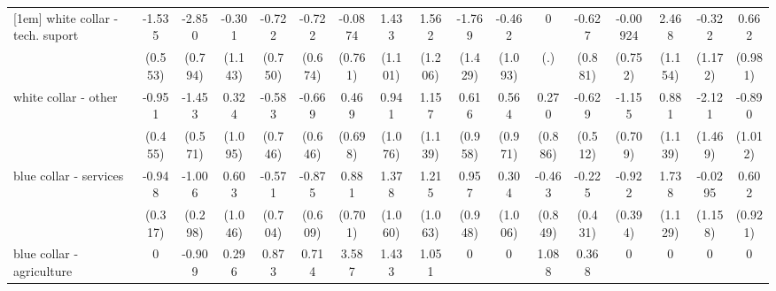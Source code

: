 {\begin{tabular}{l*{16}{c}}
[1em]
white collar - tech. suport&      -1.535\sym{**} &      -2.850\sym{***}&      -0.301         &      -0.722         &      -0.722         &     -0.0874         &       1.433         &       1.562         &      -1.769         &      -0.462         &           0         &      -0.627         &    -0.00924         &       2.468\sym{*}  &      -0.322         &       0.662         \\
                    &     (0.553)         &     (0.794)         &     (1.143)         &     (0.750)         &     (0.674)         &     (0.761)         &     (1.101)         &     (1.206)         &     (1.429)         &     (1.093)         &         (.)         &     (0.881)         &     (0.752)         &     (1.154)         &     (1.172)         &     (0.981)         \\
[1em]
white collar - other&      -0.951\sym{*}  &      -1.453\sym{*}  &       0.324         &      -0.583         &      -0.669         &       0.469         &       0.941         &       1.157         &       0.616         &       0.564         &       0.270         &      -0.629         &      -1.155         &       0.881         &      -2.121         &      -0.890         \\
                    &     (0.455)         &     (0.571)         &     (1.095)         &     (0.746)         &     (0.646)         &     (0.698)         &     (1.076)         &     (1.139)         &     (0.958)         &     (0.971)         &     (0.886)         &     (0.512)         &     (0.709)         &     (1.139)         &     (1.469)         &     (1.012)         \\
[1em]
blue collar - services&      -0.948\sym{**} &      -1.006\sym{***}&       0.603         &      -0.571         &      -0.875         &       0.881         &       1.378         &       1.215         &       0.957         &       0.304         &      -0.463         &      -0.225         &      -0.922\sym{*}  &       1.738         &     -0.0295         &       0.602         \\
                    &     (0.317)         &     (0.298)         &     (1.046)         &     (0.704)         &     (0.609)         &     (0.701)         &     (1.060)         &     (1.063)         &     (0.948)         &     (1.006)         &     (0.849)         &     (0.431)         &     (0.394)         &     (1.129)         &     (1.158)         &     (0.921)         \\
[1em]
blue collar - agriculture&           0         &      -0.909         &       0.296         &       0.873         &       0.714         &       3.587\sym{*}  &       1.433         &       1.051         &           0         &           0         &       1.088         &       0.368         &           0         &           0         &           0         &           0         \\

\end{tabular}}
